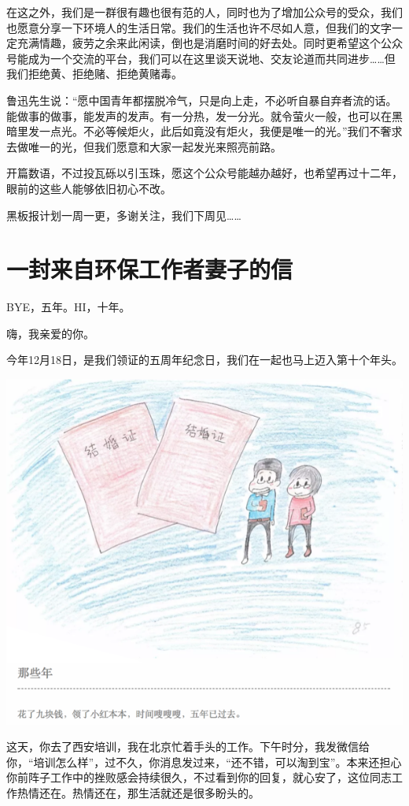 \documentclass[]{book}
\begin{document}
在这之外，我们是一群很有趣也很有范的人，同时也为了增加公众号的受众，我们也愿意分享一下环境人的生活日常。我们的生活也许不尽如人意，但我们的文字一定充满情趣，疲劳之余来此闲读，倒也是消磨时间的好去处。同时更希望这个公众号能成为一个交流的平台，我们可以在这里谈天说地、交友论道而共同进步\ldots{}\ldots{}但我们拒绝黄、拒绝赌、拒绝黄赌毒。

鲁迅先生说：``愿中国青年都摆脱冷气，只是向上走，不必听自暴自弃者流的话。能做事的做事，能发声的发声。有一分热，发一分光。就令萤火一般，也可以在黑暗里发一点光。不必等候炬火，此后如竟没有炬火，我便是唯一的光。''我们不奢求去做唯一的光，但我们愿意和大家一起发光来照亮前路。

开篇数语，不过投瓦砾以引玉珠，愿这个公众号能越办越好，也希望再过十二年，眼前的这些人能够依旧初心不改。

黑板报计划一周一更，多谢关注，我们下周见\ldots{}\ldots{}

\section{一封来自环保工作者妻子的信}

BYE，五年。HI，十年。

嗨，我亲爱的你。

今年12月18日，是我们领证的五周年纪念日，我们在一起也马上迈入第十个年头。

\includegraphics[width=8.33in]{images/wife1}

这天，你去了西安培训，我在北京忙着手头的工作。下午时分，我发微信给你，``培训怎么样''，过不久，你消息发过来，``还不错，可以淘到宝''。本来还担心你前阵子工作中的挫败感会持续很久，不过看到你的回复，就心安了，这位同志工作热情还在。热情还在，那生活就还是很多盼头的。
\end{document}
